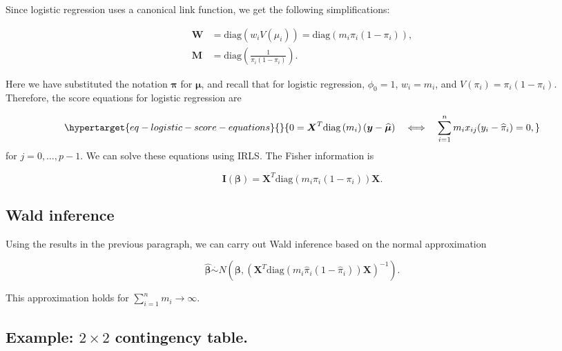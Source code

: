 \documentclass[
  11pt,
  letterpaper,
  oneside]{book}
\theoremstyle{plain}
\theoremstyle{plain}
\theoremstyle{definition}
\theoremstyle{plain}
\theoremstyle{definition}
\theoremstyle{remark}
\begin{document}
Since logistic regression uses a canonical link function, we get the
following simplifications:

\[
\begin{aligned}
\boldsymbol{W} &= \text{diag}\left(w_i V(\mu_i)\right) = \text{diag}\left(m_i \pi_i(1-\pi_i)\right), \\
\boldsymbol{M} &= \text{diag}\left(\frac{1}{\pi_i(1-\pi_i)}\right).
\end{aligned}
\]

Here we have substituted the notation \(\boldsymbol{\pi}\) for
\(\boldsymbol{\mu}\), and recall that for logistic regression,
\(\phi_0 = 1\), \(w_i = m_i\), and \(V(\pi_i) = \pi_i(1-\pi_i)\).
Therefore, the score equations for logistic regression are

\begin{equation}\protect\hypertarget{eq-logistic-score-equations}{}{
0 = \boldsymbol{X}^T \text{diag}\left(m_i\right)(\boldsymbol{y} - \boldsymbol{\widehat{\mu}}) \quad \Longleftrightarrow \quad \sum_{i = 1}^n m_i x_{ij}(y_i-\widehat{\pi}_i) = 0,
}\label{eq-logistic-score-equations}\end{equation} for
\(j = 0, \dots, p-1\). We can solve these equations using IRLS. The
Fisher information is

\[
\boldsymbol{I}(\boldsymbol{\beta}) = \boldsymbol{X}^T \text{diag}\left(m_i \pi_i(1-\pi_i)\right) \boldsymbol{X}.
\]

\hypertarget{sec-wald-inference}{%
\subsection{Wald inference}\label{sec-wald-inference}}

Using the results in the previous paragraph, we can carry out Wald
inference based on the normal approximation

\[
\boldsymbol{\widehat \beta} \overset \cdot \sim N\left(\boldsymbol \beta, \left(\boldsymbol X^T\text{diag}(m_i \widehat \pi_i(1-\widehat \pi_i))\boldsymbol X\right)^{-1}\right).
\]

This approximation holds for \(\sum_{i = 1}^n m_i \rightarrow \infty\).

\hypertarget{sec-2x2-contingency-table}{%
\subsection{\texorpdfstring{Example: \(2 \times 2\) contingency
table.}{Example: 2 \textbackslash times 2 contingency table.}}\label{sec-2x2-contingency-table}}
\end{document}

